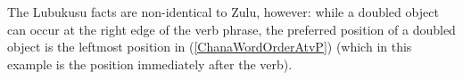 \documentclass[output=paper]{langscibook}
\begin{document}





The Lubukusu facts are non-identical to Zulu, however:  while a doubled object can occur at the right edge of the verb phrase, the preferred position of a doubled object is the leftmost position in (\ref{ChanaWordOrderAtvP}) (which in this example is the position immediately after the verb). 
    
%




\end{document}
